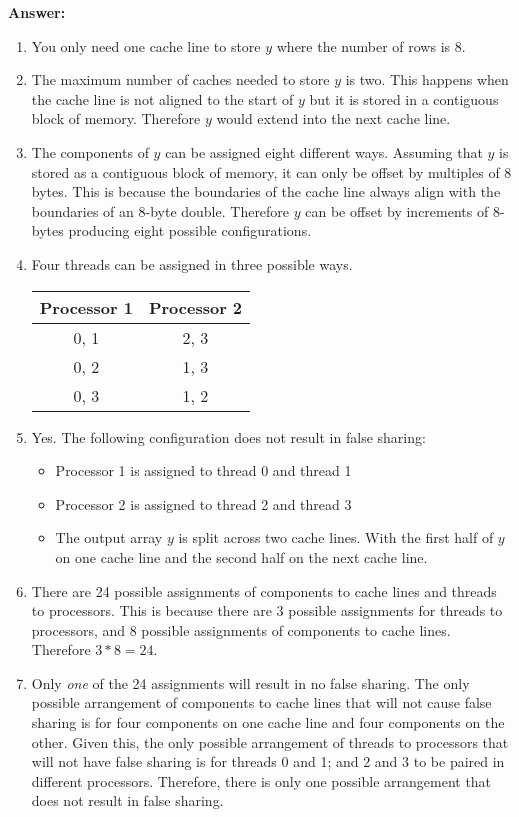 \documentclass[12pt]{article}
\begin{document}
\textbf{Answer:}
\begin{enumerate}[label=\alph*.]
    \item You only need one cache line to store $y$ where the number of rows is $8$.
    \item The maximum number of caches needed to store $y$ is two. This happens when the cache line is not aligned to the start of $y$ but it is stored in a contiguous block of memory. Therefore $y$ would extend into the next cache line.
    \item The components of $y$ can be assigned eight different ways. Assuming that $y$ is stored as a contiguous block of memory, it can only be offset by multiples of 8 bytes. This is because the boundaries of the cache line always align with the boundaries of an 8-byte double. Therefore $y$ can be offset by increments of 8-bytes producing eight possible configurations.
    \item Four threads can be assigned in three possible ways.
    
    \begin{center}
        \begin{tabular}{| c | c |}
            \hline
            Processor 1 & Processor 2\\ \hline
            0, 1 & 2, 3\\ \hline
            0, 2 & 1, 3\\ \hline
            0, 3 & 1, 2\\
            \hline
        \end{tabular}
    \end{center}
    
    \item Yes. The following configuration does not result in false sharing:
        \begin{itemize}
            \item Processor 1 is assigned to thread 0 and thread 1
            \item Processor 2 is assigned to thread 2 and thread 3
            \item The output array $y$ is split across two cache lines. With the first half of $y$ on one cache line and the second half on the next cache line.
        \end{itemize}
    \item There are 24 possible assignments of components to cache lines and threads to processors. This is because there are 3 possible assignments for threads to processors, and 8 possible assignments of components to cache lines. Therefore $3*8=24$.
    \item Only \emph{one} of the 24 assignments will result in no false sharing. The only possible arrangement of components to cache lines that will not cause false sharing is for four components on one cache line and four components on the other. Given this, the only possible arrangement of threads to processors that will not have false sharing is for threads 0 and 1; and 2 and 3 to be paired in different processors. Therefore, there is only one possible arrangement that does not result in false sharing.
\end{enumerate}
\end{document}
